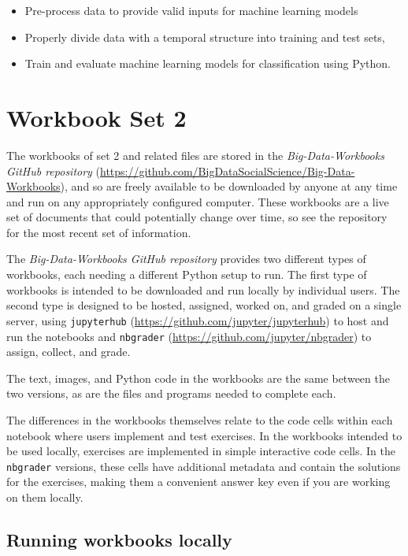 \documentclass[]{krantz}
\begin{document}
\begin{itemize}
\item
  Pre-process data to provide valid inputs for machine learning models
\item
  Properly divide data with a temporal structure into training and test
  sets,
\item
  Train and evaluate machine learning models for classification using
  Python.
\end{itemize}

\section{Workbook Set 2}\label{workbook-set-2}

The workbooks of set 2 and related files are stored in the
\emph{Big-Data-Workbooks GitHub repository}
(\url{https://github.com/BigDataSocialScience/Big-Data-Workbooks}), and
so are freely available to be downloaded by anyone at any time and run
on any appropriately configured computer. These workbooks are a live set
of documents that could potentially change over time, so see the
repository for the most recent set of information.

The \emph{Big-Data-Workbooks GitHub repository} provides two different
types of workbooks, each needing a different Python setup to run. The
first type of workbooks is intended to be downloaded and run locally by
individual users. The second type is designed to be hosted, assigned,
worked on, and graded on a single server, using \texttt{jupyterhub}
(\url{https://github.com/jupyter/jupyterhub}) to host and run the
notebooks and \texttt{nbgrader}
(\url{https://github.com/jupyter/nbgrader}) to assign, collect, and
grade.

The text, images, and Python code in the workbooks are the same between
the two versions, as are the files and programs needed to complete each.

The differences in the workbooks themselves relate to the code cells
within each notebook where users implement and test exercises. In the
workbooks intended to be used locally, exercises are implemented in
simple interactive code cells. In the \texttt{nbgrader} versions, these
cells have additional metadata and contain the solutions for the
exercises, making them a convenient answer key even if you are working
on them locally.

\subsection{Running workbooks locally}\label{running-workbooks-locally}
\end{document}
